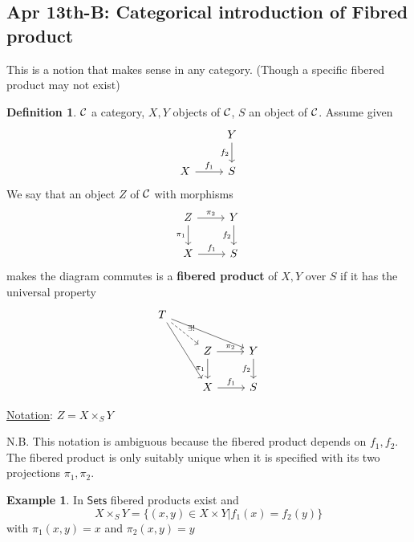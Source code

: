 \documentclass[11pt]{article}
\theoremstyle{definition}
\newtheorem{dfn}[thm]{Definition}
\newtheorem{ex}[thm]{Example}
\newcommand{\calc}{{\cal C}}
\begin{document}
\subsection{Apr 13th-B: Categorical introduction of Fibred product}
This is a notion that makes sense in any category. (Though a specific fibered product may not exist)
\begin{dfn}
$\calc$ a category, $X,Y$ objects of $\calc$, $S$ an object of $\calc$. Assume given
$$
\begin{tikzcd}
 & Y \arrow[d, "f_2"'] \\
X \arrow[r, "f_1"] & S
\end{tikzcd}
$$
We say that an object $Z$ of $\calc$ with morphisms 
$$
\begin{tikzcd}
Z \arrow[r, "\pi_2"] \arrow[d, "\pi_1"'] & Y \arrow[d, "f_2"'] \\
X \arrow[r, "f_1"] & S
\end{tikzcd}
$$
makes the diagram commutes is a \textbf{fibered product} of $X,Y$ over $S$ if it has the universal property
$$
\begin{tikzcd}
T \arrow[rdd] \arrow[rrd] \arrow[rd, "\exists!", dashed] &  &  \\
 & Z \arrow[r, "\pi_2"] \arrow[d, "\pi_1"'] & Y \arrow[d, "f_2"'] \\
 & X \arrow[r, "f_1"] & S
\end{tikzcd}
$$

\underline{Notation}: $Z=X\times_S Y$
\end{dfn}
N.B. This notation is ambiguous because the fibered product depends on $f_1,f_2$. The fibered product is only suitably unique when it is specified with its two projections $\pi_1,\pi_2$.
\begin{ex}
In $\mathsf{Sets}$ fibered products exist and
$$
X\times_S Y=\{(x,y)\in X\times Y|f_1(x)=f_2(y)\}
$$
with $\pi_1(x,y)=x$ and $\pi_2(x,y)=y$
\end{ex}
\end{document}
